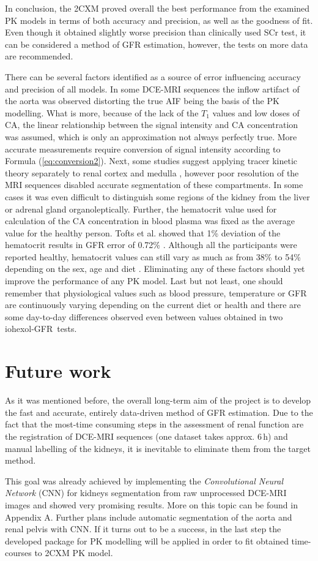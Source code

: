 In conclusion, the 2CXM proved overall the best performance from the examined PK models in terms of both accuracy and precision, as well as the goodness of fit. Even though it obtained slightly worse precision than clinically used SCr test, it can be considered a method of GFR estimation, however, the tests on more data are recommended.      


There can be several factors identified as a source of error influencing accuracy and precision of all models. In some DCE-MRI sequences the inflow artifact of the aorta was observed distorting the true AIF being the basis of the PK modelling.   
What is more, because of the lack of the $T_1$ values and low doses of CA, the linear relationship between the signal intensity and CA concentration was assumed, which is only an approximation not always perfectly true. More accurate measurements require conversion of signal intensity according to Formula (\ref{eq:conversion2}).  
Next, some studies suggest applying tracer kinetic theory separately to renal cortex and medulla \cite{baumann2000quantitative, lee2007renal}, however poor resolution of the MRI sequences disabled accurate segmentation of these compartments. In some cases it was even difficult to distinguish some regions of the kidney from the liver or adrenal gland organoleptically.   
Further, the hematocrit value used for calculation of the CA concentration in blood plasma was fixed as the average value for the  healthy person. Tofts et al. \cite{tofts2012precise} showed that  1\% deviation of the hematocrit results in GFR error of 0.72\% . Although all the participants were reported healthy, hematocrit values can still vary as much as from 38\% to 54\% depending on the sex, age and diet \cite{hct}. Eliminating any of these factors should yet improve the performance of any PK model.   
Last but not least, one should remember that physiological values such as blood pressure, temperature or GFR are continuously varying depending on the current diet or health and there are some day-to-day differences observed even between values obtained in two iohexol-GFR~tests.

\section{Future work}
As it was mentioned before, the overall long-term aim of the project is to develop the fast and accurate, entirely data-driven method of GFR estimation. Due to the fact that the most-time consuming steps in the assessment of renal function are the registration of DCE-MRI sequences (one dataset takes approx. 6\,h) and manual labelling of the kidneys, it is inevitable to eliminate them from the target method.   

This goal was already achieved by implementing the \textit{Convolutional Neural Network} (CNN) for kidneys segmentation from raw unprocessed DCE-MRI images  and showed very promising results. 
More on this topic can be found in Appendix A. Further plans include automatic segmentation of the aorta and renal pelvis with CNN. If it turns out to be a success, in the last step the developed package for PK modelling will be applied in order to fit obtained time-courses to 2CXM PK model.